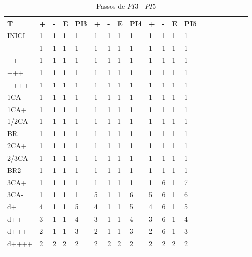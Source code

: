 \documentclass[12pt,a4paper]{report}
\begin{document}
\begin{table}[ht]
\caption{\label{tab:table-name} Passos de $PI3$ - $PI5$}
\centering
\begin{tabular}{ l l l l l l l l l l l l l l l l l l l l }
\hline
\hline
T      & + & - & E & PI3 & + & - & E & PI4 & + & - & E & PI5 &  &  &  &  &  &  &  \\ \hline
INICI  & 1 & 1 & 1 & 1   & 1 & 1 & 1 & 1   & 1 & 1 & 1 & 1   &  &  &  &  &  &  &  \\
+      & 1 & 1 & 1 & 1   & 1 & 1 & 1 & 1   & 1 & 1 & 1 & 1   &  &  &  &  &  &  &  \\
++     & 1 & 1 & 1 & 1   & 1 & 1 & 1 & 1   & 1 & 1 & 1 & 1   &  &  &  &  &  &  &  \\
+++    & 1 & 1 & 1 & 1   & 1 & 1 & 1 & 1   & 1 & 1 & 1 & 1   &  &  &  &  &  &  &  \\
++++   & 1 & 1 & 1 & 1   & 1 & 1 & 1 & 1   & 1 & 1 & 1 & 1   &  &  &  &  &  &  &  \\
1CA-   & 1 & 1 & 1 & 1   & 1 & 1 & 1 & 1   & 1 & 1 & 1 & 1   &  &  &  &  &  &  &  \\
1CA+   & 1 & 1 & 1 & 1   & 1 & 1 & 1 & 1   & 1 & 1 & 1 & 1   &  &  &  &  &  &  &  \\
1/2CA- & 1 & 1 & 1 & 1   & 1 & 1 & 1 & 1   & 1 & 1 & 1 & 1   &  &  &  &  &  &  &  \\
BR     & 1 & 1 & 1 & 1   & 1 & 1 & 1 & 1   & 1 & 1 & 1 & 1   &  &  &  &  &  &  &  \\
2CA+   & 1 & 1 & 1 & 1   & 1 & 1 & 1 & 1   & 1 & 1 & 1 & 1   &  &  &  &  &  &  &  \\
2/3CA- & 1 & 1 & 1 & 1   & 1 & 1 & 1 & 1   & 1 & 1 & 1 & 1   &  &  &  &  &  &  &  \\
BR2    & 1 & 1 & 1 & 1   & 1 & 1 & 1 & 1   & 1 & 1 & 1 & 1   &  &  &  &  &  &  &  \\
3CA+   & 1 & 1 & 1 & 1   & 1 & 1 & 1 & 1   & 1 & 6 & 1 & 7   &  &  &  &  &  &  &  \\
3CA-   & 1 & 1 & 1 & 1   & 5 & 1 & 1 & 6   & 5 & 6 & 1 & 6   &  &  &  &  &  &  &  \\
d+     & 4 & 1 & 1 & 5   & 4 & 1 & 1 & 5   & 4 & 6 & 1 & 5   &  &  &  &  &  &  &  \\
d++    & 3 & 1 & 1 & 4   & 3 & 1 & 1 & 4   & 3 & 6 & 1 & 4   &  &  &  &  &  &  &  \\
d+++   & 2 & 1 & 1 & 3   & 2 & 1 & 1 & 3   & 2 & 6 & 1 & 3   &  &  &  &  &  &  &  \\
d++++  & 2 & 2 & 2 & 2   & 2 & 2 & 2 & 2   & 2 & 2 & 2 & 2   &  &  &  &  &  &  &  \\
       &   &   &   &     &   &   &   &     &   &   &   &     &  &  &  &  &  &  &  \\ 
       \hline
\end{tabular}
\end{table}
\end{document}
